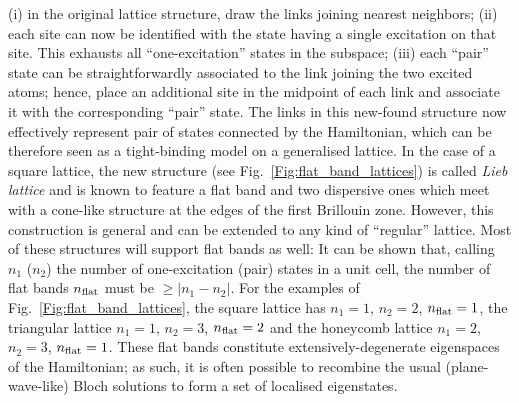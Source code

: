 \documentclass[prl,aps,twocolumn,showpacs,superscriptaddress,longbibliography]{revtex4-1}
\newcommand{\abs}[1]{\left| #1 \right|}
\begin{document}
(i) in the original lattice structure, draw the links joining nearest neighbors; (ii) each site can now be identified with the state having a single excitation on that site. This exhausts all ``one-excitation'' states in the subspace; (iii) each ``pair'' state can be straightforwardly associated to the link joining the two excited atoms; hence, place an additional site in the midpoint of each link and associate it with the corresponding ``pair'' state. The links in this new-found structure now effectively represent pair of states connected by the Hamiltonian, which can be therefore seen as a tight-binding model on a generalised lattice. In the case of a square lattice, the new structure (see Fig.~\ref{Fig:flat_band_lattices}) is called \emph{Lieb lattice} and is known to feature a flat band and two dispersive ones which meet with a cone-like structure at the edges of the first Brillouin zone. However, this construction is general and can be extended to any kind of ``regular'' lattice. Most of these structures will support flat bands as well: It can be shown \cite{SM} that, calling $n_1$ ($n_2$) the number of one-excitation (pair) states in a unit cell, the number of flat bands $n_{\rm flat}$ must be $\geq \abs{n_1 - n_2}$. For the examples of Fig.~\ref{Fig:flat_band_lattices}, the square lattice has $n_1 = 1$, $n_2 = 2$, $n_{\rm flat} = 1$, the triangular lattice $n_1 = 1$, $n_2 = 3$, $n_{\rm flat} = 2$ and the honeycomb lattice $n_1 = 2$, $n_2 = 3$, $n_{\rm flat} = 1$. These flat bands constitute extensively-degenerate eigenspaces of the Hamiltonian; as such, it is often possible to recombine the usual (plane-wave-like) Bloch solutions to form a set of localised eigenstates. 
\end{document}
